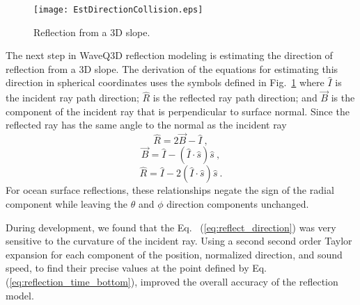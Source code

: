 \documentclass{ws-jca}
\newcommand{\threeD}{3\nobreakdash\textendash D }	%
\begin{document}
\begin{figure}[th]
	\centerline{\texttt{[image: EstDirectionCollision.eps]}} 
	\vspace*{8pt}
	\caption{Reflection from a \threeD slope.}
	\label{fig:reflect3d}
\end{figure}
The next step in WaveQ3D reflection modeling is estimating the direction of
reflection from a \threeD slope. The derivation of the equations for
estimating this direction in spherical coordinates uses the
symbols defined in Fig.~\ref{fig:reflect3d} 
where
\(\hat{I}\) is the incident ray path direction;
\(\hat{R}\) is the reflected ray path direction; and
\(\vec{B}\) is the component of the incident ray that is perpendicular to surface normal.
Since the reflected ray has the same angle to the normal as the incident ray
\begin{equation}
\hat{R} = 2\vec{B} - \hat{I} \:,
\label{eq:reflect_r_hat}
\end{equation}
\begin{equation}
\vec{B} =  \hat{I} - ( \hat{I} \cdot \hat{s} ) \hat{s} \:,
\label{eq:reflect_p_hat}
\end{equation}
\begin{equation}
\hat{R} =  \hat{I} - 2 ( \hat{I} \cdot \hat{s} ) \hat{s} \:.
\label{eq:reflect_direction}
\end{equation}
For ocean surface reflections, these relationships negate the sign of the
radial component while leaving the \(\theta\) and \(\phi\) direction
components unchanged.

During development, we found that the Eq.~ (\ref{eq:reflect_direction}) was very sensitive to the curvature of the incident ray.  Using a second second order Taylor expansion for each component of the position,
normalized direction, and sound speed, to find their precise values at the point
defined by Eq. (\ref{eq:reflection_time_bottom}), improved the overall accuracy of the reflection model.
\end{document}
